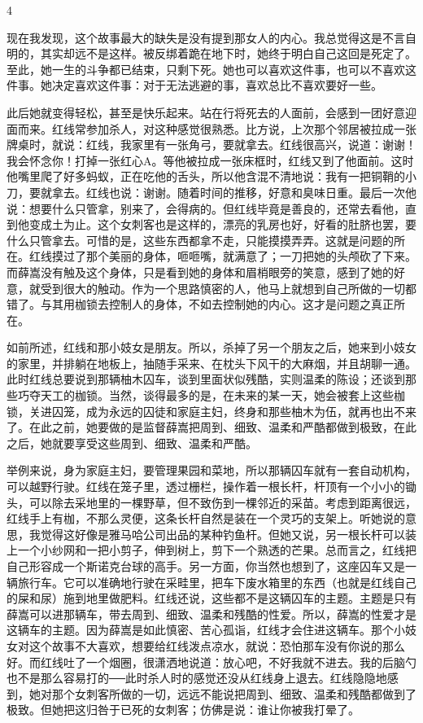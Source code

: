 4 

现在我发现，这个故事最大的缺失是没有提到那女人的内心。我总觉得这是不言自明的，其实却远不是这样。被反绑着跪在地下时，她终于明白自己这回是死定了。至此，她一生的斗争都已结束，只剩下死。她也可以喜欢这件事，也可以不喜欢这件事。她决定喜欢这件事：对于无法逃避的事，喜欢总比不喜欢要好一些。 

此后她就变得轻松，甚至是快乐起来。站在行将死去的人面前，会感到一团好意迎面而来。红线常参加杀人，对这种感觉很熟悉。比方说，上次那个邻居被拉成一张牌桌时，就说：红线，我家里有一张角弓，要就拿去。红线很高兴，说道：谢谢！我会怀念你！打掉一张红心A。等他被拉成一张床框时，红线又到了他面前。这时他嘴里爬了好多蚂蚁，正在吃他的舌头，所以他含混不清地说：我有一把铜鞘的小刀，要就拿去。红线也说：谢谢。随着时间的推移，好意和臭味日重。最后一次他说：想要什么只管拿，别来了，会得病的。但红线毕竟是善良的，还常去看他，直到他变成土为止。这个女刺客也是这样的，漂亮的乳房也好，好看的肚脐也罢，要什么只管拿去。可惜的是，这些东西都拿不走，只能摸摸弄弄。这就是问题的所在。红线摸过了那个美丽的身体，咂咂嘴，就满意了；一刀把她的头颅砍了下来。而薛嵩没有触及这个身体，只是看到她的身体和眉梢眼旁的笑意，感到了她的好意，就受到很大的触动。作为一个思路慎密的人，他马上就想到自己所做的一切都错了。与其用枷锁去控制人的身体，不如去控制她的内心。这才是问题之真正所在。 

如前所述，红线和那小妓女是朋友。所以，杀掉了另一个朋友之后，她来到小妓女的家里，并排躺在地板上，抽随手采来、在枕头下风干的大麻烟，并且胡聊一通。此时红线总要说到那辆柚木囚车，谈到里面状似残酷，实则温柔的陈设；还谈到那些巧夺天工的枷锁。当然，谈得最多的是，在未来的某一天，她会被套上这些枷锁，关进囚笼，成为永远的囚徒和家庭主妇，终身和那些柚木为伍，就再也出不来了。在此之前，她要做的是监督薛嵩把周到、细致、温柔和严酷都做到极致，在此之后，她就要享受这些周到、细致、温柔和严酷。 

举例来说，身为家庭主妇，要管理果园和菜地，所以那辆囚车就有一套自动机构，可以越野行驶。红线在笼子里，透过栅栏，操作着一根长杆，杆顶有一个小小的锄头，可以除去采地里的一棵野草，但不致伤到一棵邻近的采苗。考虑到距离很远，红线手上有枷，不那么灵便，这条长杆自然是装在一个灵巧的支架上。听她说的意思，我觉得这好像是雅马哈公司出品的某种钓鱼杆。但她又说，另一根长杆可以装上一个小纱网和一把小剪子，伸到树上，剪下一个熟透的芒果。总而言之，红线把自己形容成一个斯诺克台球的高手。另一方面，你当然也想到了，这座囚车又是一辆旅行车。它可以准确地行驶在采畦里，把车下废水箱里的东西（也就是红线自己的屎和尿）施到地里做肥料。红线还说，这些都不是这辆囚车的主题。主题是只有薛嵩可以进那辆车，带去周到、细致、温柔和残酷的性爱。所以，薛嵩的性爱才是这辆车的主题。因为薛嵩是如此慎密、苦心孤诣，红线才会住进这辆车。那个小妓女对这个故事不大喜欢，想要给红线泼点凉水，就说：恐怕那车没有你说的那么好。而红线吐了一个烟圈，很潇洒地说道：放心吧，不好我就不进去。我的后脑勺也不是那么容易打的──此时杀人时的感觉还没从红线身上退去。红线隐隐地感到，她对那个女刺客所做的一切，远远不能说把周到、细致、温柔和残酷都做到了极致。但她把这归咎于已死的女刺客；仿佛是说：谁让你被我打晕了。 

